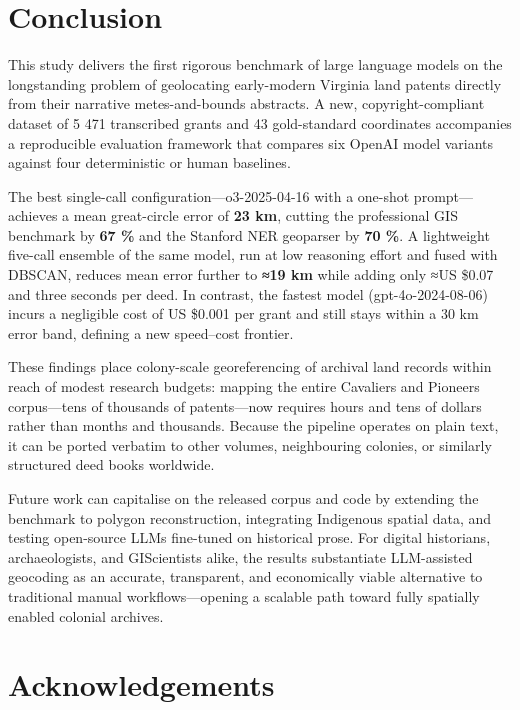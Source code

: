 \section{Conclusion}\label{conclusion}

This study delivers the first rigorous benchmark of large language
models on the longstanding problem of geolocating early-modern Virginia
land patents directly from their narrative metes-and-bounds abstracts. A
new, copyright-compliant dataset of 5 471 transcribed grants and 43
gold-standard coordinates accompanies a reproducible evaluation
framework that compares six OpenAI model variants against four
deterministic or human baselines.

The best single-call configuration---o3-2025-04-16 with a one-shot
prompt---achieves a mean great-circle error of \textbf{23 km}, cutting
the professional GIS benchmark by \textbf{67 \%} and the Stanford NER
geoparser by \textbf{70 \%}. A lightweight five-call ensemble of the
same model, run at low reasoning effort and fused with DBSCAN, reduces
mean error further to \textbf{≈19 km} while adding only ≈US \$0.07 and
three seconds per deed. In contrast, the fastest model
(gpt-4o-2024-08-06) incurs a negligible cost of US \$0.001 per grant and
still stays within a 30 km error band, defining a new speed--cost
frontier.

These findings place colony-scale georeferencing of archival land
records within reach of modest research budgets: mapping the entire
Cavaliers and Pioneers corpus---tens of thousands of patents---now
requires hours and tens of dollars rather than months and thousands.
Because the pipeline operates on plain text, it can be ported verbatim
to other volumes, neighbouring colonies, or similarly structured deed
books worldwide.

Future work can capitalise on the released corpus and code by extending
the benchmark to polygon reconstruction, integrating Indigenous spatial
data, and testing open-source LLMs fine-tuned on historical prose. For
digital historians, archaeologists, and GIScientists alike, the results
substantiate LLM-assisted geocoding as an accurate, transparent, and
economically viable alternative to traditional manual
workflows---opening a scalable path toward fully spatially enabled
colonial archives.

\section{Acknowledgements}\label{acknowledgements}

